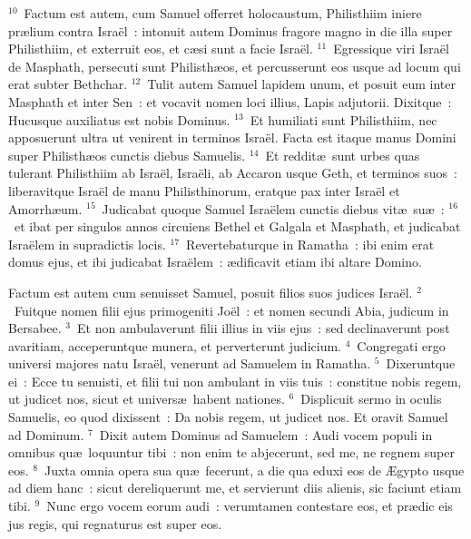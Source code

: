 ${}^{10}$~Factum est autem, cum Samuel offerret holocaustum, Philisthiim iniere pr\ae lium contra Isra\"el~: intonuit autem Dominus fragore magno in die illa super Philisthiim, et exterruit eos, et c\ae si sunt a facie Isra\"el.
${}^{11}$~Egressique viri Isra\"el de Masphath, persecuti sunt Philisth\ae os, et percusserunt eos usque ad locum qui erat subter Bethchar.
${}^{12}$~Tulit autem Samuel lapidem unum, et posuit eum inter Masphath et inter Sen~: et vocavit nomen loci illius, Lapis adjutorii. Dixitque~: Hucusque auxiliatus est nobis Dominus.
${}^{13}$~Et humiliati sunt Philisthiim, nec apposuerunt ultra ut venirent in terminos Isra\"el. Facta est itaque manus Domini super Philisth\ae os cunctis diebus Samuelis.
${}^{14}$~Et reddit\ae\ sunt urbes quas tulerant Philisthiim ab Isra\"el, Isra\"eli, ab Accaron usque Geth, et terminos suos~: liberavitque Isra\"el de manu Philisthinorum, eratque pax inter Isra\"el et Amorrh\ae um.
${}^{15}$~Judicabat quoque Samuel Isra\"elem cunctis diebus vit\ae\ su\ae~:
${}^{16}$~et ibat per singulos annos circuiens Bethel et Galgala et Masphath, et judicabat Isra\"elem in supradictis locis.
${}^{17}$~Revertebaturque in Ramatha~: ibi enim erat domus ejus, et ibi judicabat Isra\"elem~: \ae dificavit etiam ibi altare Domino.

\lettrine[lines=10,image=true,loversize=0.05,lraise=-0.03]{F}{}actum est autem cum senuisset Samuel, posuit filios suos judices Isra\"el.
${}^{2}$~Fuitque nomen filii ejus primogeniti Jo\"el~: et nomen secundi Abia, judicum in Bersabee.
${}^{3}$~Et non ambulaverunt filii illius in viis ejus~: sed declinaverunt post avaritiam, acceperuntque munera, et perverterunt judicium.
${}^{4}$~Congregati ergo universi majores natu Isra\"el, venerunt ad Samuelem in Ramatha.
${}^{5}$~Dixeruntque ei~: Ecce tu senuisti, et filii tui non ambulant in viis tuis~: constitue nobis regem, ut judicet nos, sicut et univers\ae\ habent nationes.
${}^{6}$~Displicuit sermo in oculis Samuelis, eo quod dixissent~: Da nobis regem, ut judicet nos. Et oravit Samuel ad Dominum.
${}^{7}$~Dixit autem Dominus ad Samuelem~: Audi vocem populi in omnibus qu\ae\ loquuntur tibi~: non enim te abjecerunt, sed me, ne regnem super eos.
${}^{8}$~Juxta omnia opera sua qu\ae\ fecerunt, a die qua eduxi eos de \AE gypto usque ad diem hanc~: sicut dereliquerunt me, et servierunt diis alienis, sic faciunt etiam tibi.
${}^{9}$~Nunc ergo vocem eorum audi~: verumtamen contestare eos, et pr\ae dic eis jus regis, qui regnaturus est super eos.



